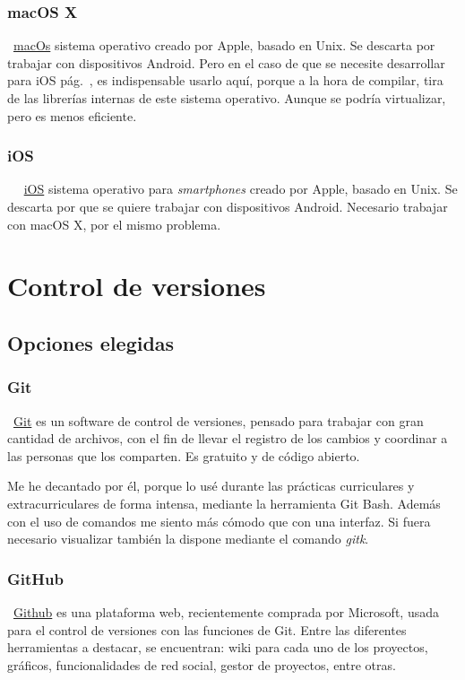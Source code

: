 \subsubsection{macOS X}
~\href{https://www.apple.com/es/macos}{macOs} sistema operativo creado por Apple, basado en Unix. Se descarta por trabajar con dispositivos Android. Pero en el caso de que se necesite desarrollar para iOS pág.~\pageref{ios}, es indispensable usarlo aquí, porque a la hora de compilar, tira de las librerías internas de este sistema operativo.
Aunque se podría virtualizar, pero es menos eficiente.

\subsubsection{iOS}~\label{ios}
~\href{https://www.apple.com/es/ios}{iOS} sistema operativo para \emph{smartphones} creado por Apple, basado en Unix. Se descarta por que se quiere trabajar con dispositivos Android. Necesario trabajar con macOS X, por el mismo problema.

\section{Control de versiones}

\subsection{Opciones elegidas}

\subsubsection{Git}
~\href{https://git-scm.com//}{Git} es un software de control de versiones, pensado para trabajar con gran cantidad de archivos, con el fin de llevar el registro de los cambios y coordinar a las personas que los comparten. Es gratuito y de código abierto.

Me he decantado por él, porque lo usé durante las prácticas curriculares y extracurriculares de forma intensa, mediante la herramienta Git Bash. Además con el uso de comandos me siento más cómodo que con una interfaz. Si fuera necesario visualizar también la dispone mediante el comando \emph{gitk}.

\subsubsection{GitHub}\label{github}
~\href{https://github.com/}{Github} es una plataforma web, recientemente comprada por Microsoft, usada para el control de versiones con las funciones de Git. Entre las diferentes herramientas a destacar, se encuentran: wiki para cada uno de los proyectos, gráficos, funcionalidades de red social, gestor de proyectos, entre otras.

